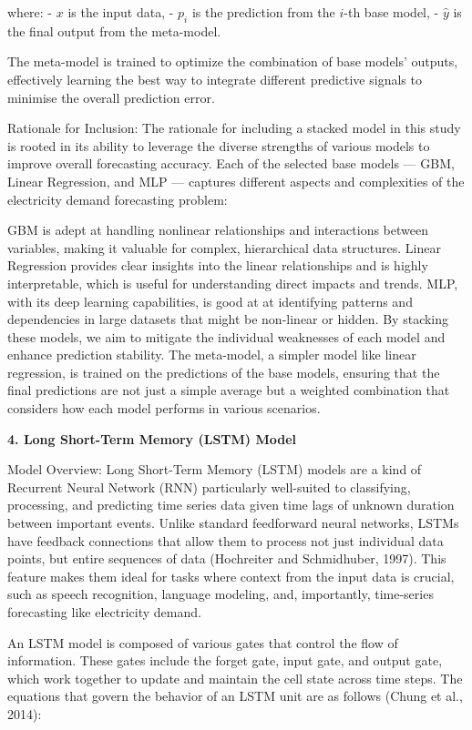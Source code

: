\documentclass[
]{article}
\begin{document}
where: - \(x\) is the input data, - \(p_i\) is the prediction from the
\(i\)-th base model, - \(\hat{y}\) is the final output from the
meta-model.

The meta-model is trained to optimize the combination of base models'
outputs, effectively learning the best way to integrate different
predictive signals to minimise the overall prediction error.

Rationale for Inclusion: The rationale for including a stacked model in
this study is rooted in its ability to leverage the diverse strengths of
various models to improve overall forecasting accuracy. Each of the
selected base models --- GBM, Linear Regression, and MLP --- captures
different aspects and complexities of the electricity demand forecasting
problem:

GBM is adept at handling nonlinear relationships and interactions
between variables, making it valuable for complex, hierarchical data
structures. Linear Regression provides clear insights into the linear
relationships and is highly interpretable, which is useful for
understanding direct impacts and trends. MLP, with its deep learning
capabilities, is good at at identifying patterns and dependencies in
large datasets that might be non-linear or hidden. By stacking these
models, we aim to mitigate the individual weaknesses of each model and
enhance prediction stability. The meta-model, a simpler model like
linear regression, is trained on the predictions of the base models,
ensuring that the final predictions are not just a simple average but a
weighted combination that considers how each model performs in various
scenarios.

\textbf{4. Long Short-Term Memory (LSTM) Model}

Model Overview: Long Short-Term Memory (LSTM) models are a kind of
Recurrent Neural Network (RNN) particularly well-suited to classifying,
processing, and predicting time series data given time lags of unknown
duration between important events. Unlike standard feedforward neural
networks, LSTMs have feedback connections that allow them to process not
just individual data points, but entire sequences of data (Hochreiter
and Schmidhuber, 1997). This feature makes them ideal for tasks where
context from the input data is crucial, such as speech recognition,
language modeling, and, importantly, time-series forecasting like
electricity demand.

An LSTM model is composed of various gates that control the flow of
information. These gates include the forget gate, input gate, and output
gate, which work together to update and maintain the cell state across
time steps. The equations that govern the behavior of an LSTM unit are
as follows (Chung et al., 2014):
\end{document}
